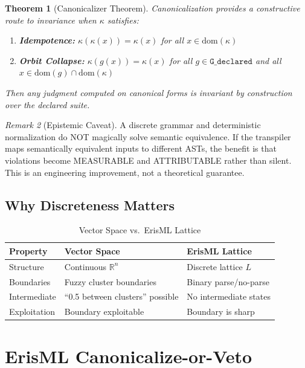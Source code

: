 \documentclass[11pt,letterpaper]{article}
\newtheorem{theorem}{Theorem}[section]
\theoremstyle{definition}
\theoremstyle{remark}
\newtheorem{remark}[theorem]{Remark}
\begin{document}
\begin{theorem}[Canonicalizer Theorem]
\label{thm:canonicalizer}
Canonicalization provides a constructive route to invariance when $\kappa$ satisfies:
\begin{enumerate}
\item \textbf{Idempotence:} $\kappa(\kappa(x)) = \kappa(x)$ for all $x \in \mathrm{dom}(\kappa)$
\item \textbf{Orbit Collapse:} $\kappa(g(x)) = \kappa(x)$ for all $g \in \texttt{G\_declared}$ and all $x \in \mathrm{dom}(g) \cap \mathrm{dom}(\kappa)$
\end{enumerate}
Then any judgment computed on canonical forms is invariant by construction over the declared suite.
\end{theorem}

\begin{remark}[Epistemic Caveat]
A discrete grammar and deterministic normalization do NOT magically solve semantic equivalence. If the transpiler maps semantically equivalent inputs to different ASTs, the benefit is that violations become MEASURABLE and ATTRIBUTABLE rather than silent. This is an engineering improvement, not a theoretical guarantee.
\end{remark}

\subsection{Why Discreteness Matters}

\begin{table}[h]
\centering
\begin{tabular}{@{}lll@{}}
\toprule
\textbf{Property} & \textbf{Vector Space} & \textbf{ErisML Lattice} \\
\midrule
Structure & Continuous $\mathbb{R}^n$ & Discrete lattice $L$ \\
Boundaries & Fuzzy cluster boundaries & Binary parse/no-parse \\
Intermediate & ``0.5 between clusters'' possible & No intermediate states \\
Exploitation & Boundary exploitable & Boundary is sharp \\
\bottomrule
\end{tabular}
\caption{Vector Space vs.\ ErisML Lattice}
\end{table}


\section{ErisML Canonicalize-or-Veto}
\end{document}
